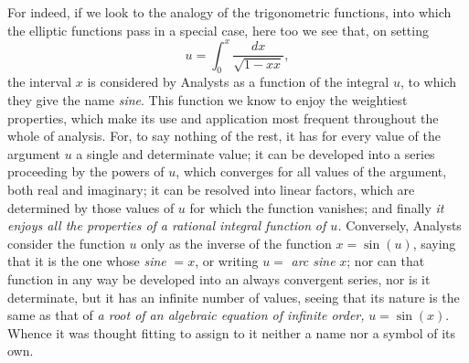 \documentclass{article}
\begin{document}
For indeed, if we look to the analogy of the trigonometric functions, into which the elliptic functions pass in a special case, here too we see that, on setting
\[ u = \int_0^{x} \frac{dx}{\sqrt{1-xx}}, \]
the interval $x$ is considered by Analysts as a function of the integral $u$, to which they give the name \emph{sine}. This function we know to enjoy the weightiest properties, which make its use and application most frequent throughout the whole of analysis. For, to say nothing of the rest, it has for every value of the argument $u$ a single and determinate value; it can be developed into a series proceeding by the powers of $u$, which converges for all values of the argument, both real and imaginary; it can be resolved into linear factors, which are determined by those values of $u$ for which the function vanishes; and finally \emph{it enjoys all the properties of a rational integral function}
\emph{of $u$.} Conversely, Analysts consider the function $u$ only as the inverse of the function $x = \sin(u)$, saying that it is the one whose \emph{sine} $= x$, or writing $u = $ \emph{arc sine} $x$; nor can that function in any way be developed into an always convergent series, nor is it determinate, but it has an infinite number of values, seeing that its nature is the same as that of \emph{a root of an algebraic equation of infinite order,} $u = \sin(x)$. Whence it was thought fitting to assign to it neither a name nor a symbol of its own.
\end{document}
